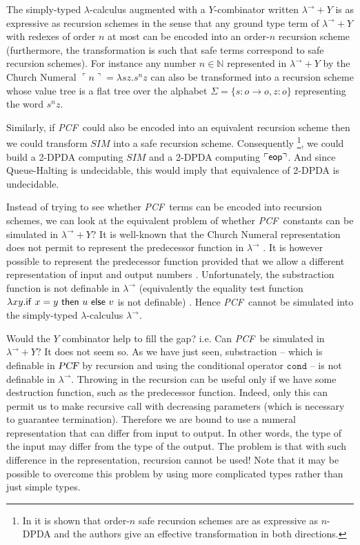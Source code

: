 \documentclass{article}
\newcommand{\encode}[1]{\ulcorner #1 \urcorner}
\newcommand{\nat}{\mathbb{N}}
\newcommand\eop{{\sf eop}}
\newcommand\pcf{\textsl{PCF}}
\newcommand\pcfcond{\texttt{cond}}
\begin{document}
The simply-typed $\lambda$-calculus augmented with a $Y$-combinator written $\lambda^\rightarrow + Y$ is as expressive as recursion schemes in the sense that any ground type term of $\lambda^\rightarrow + Y$ with redexes of order $n$ at most can be encoded into an order-$n$ recursion scheme (furthermore, the transformation is such that safe terms correspond to safe recursion schemes).
For instance any number $n \in \nat$ represented in $\lambda^\rightarrow + Y$ by the Church Numeral $\encode{n} = \lambda s z. s^n z$ can also be transformed into a recursion scheme whose value tree is a flat tree over the alphabet $\Sigma = \{s:o\rightarrow o, z:o\}$ representing the word $s^n z$.


Similarly, if \pcf\ could also be encoded into an equivalent recursion scheme then we could transform $SIM$ into a safe recursion scheme. Consequently \footnote{In \cite{KNU02} it is shown that order-$n$ safe recursion schemes are as expressive as $n$-DPDA and the authors give an effective transformation in both directions.}, we could build a 2-DPDA computing $SIM$ and a 2-DPDA computing $\encode{\eop}$. And since Queue-Halting is undecidable, this would imply that equivalence of 2-DPDA is undecidable.

Instead of trying to see whether \pcf\ terms can be encoded into
recursion schemes, we can look at the equivalent problem of whether
\pcf\ constants can be simulated in $\lambda^\rightarrow + Y$? It is
well-known that the Church Numeral representation does not permit to
represent the predecessor function in $\lambda^\rightarrow$
\cite{DBLP:journals/jacm/FortuneLO83}. It is however possible to
represent the predecessor function provided that we allow a
different representation of input and output numbers
\cite{DBLP:journals/jacm/FortuneLO83}. Unfortunately, the
substraction function is not definable in $\lambda^\rightarrow$
(equivalently  the equality test function $\lambda xy. {\sf if\ } x
= y {\sf\ then\ } u {\sf\ else\ } v$ is not definable)
\cite{DBLP:journals/jacm/FortuneLO83}. Hence \pcf\ cannot be
simulated into the simply-typed $\lambda$-calculus
$\lambda^\rightarrow$.

Would the $Y$ combinator help to fill the gap? i.e. Can \pcf\ be
simulated in  $\lambda^\rightarrow + Y$? It does not seem so. As we
have just seen, substraction -- which is definable in $\pcf$  by
recursion and using the conditional operator $\pcfcond$ -- is not
definable in $\lambda^\rightarrow$. Throwing in the recursion can be
useful only if we have some destruction function, such as the
predecessor function. Indeed, only this can permit us to make
recursive call with decreasing parameters (which is necessary to
guarantee termination). Therefore we are bound to use a numeral
representation that can differ from input to output. In other words,
the type of the input may differ from the type of the output. The
problem is that with such difference in the representation,
recursion cannot be used! Note that it may be possible to overcome
this problem by using more complicated types rather than just simple
types.
\end{document}
